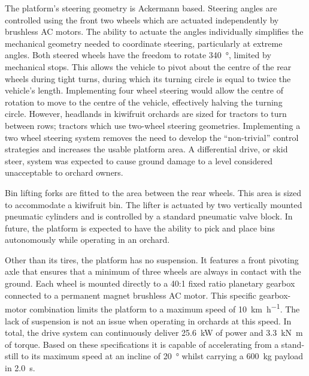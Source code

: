 \documentclass[preprint,authoryear,12pt]{elsarticle}
\begin{document}
        The platform's steering geometry is Ackermann based.
        Steering angles are controlled using the front two wheels which are actuated independently by brushless AC motors.
        The ability to actuate the angles individually simplifies the mechanical geometry needed to coordinate steering, particularly at extreme angles.
        Both steered wheels have the freedom to rotate \SI{340}{\degree}, limited by mechanical stops.
        This allows the vehicle to pivot about the centre of the rear wheels during tight turns, during which its turning circle is equal to twice the vehicle's length.
        Implementing four wheel steering would allow the centre of rotation to move to the centre of the vehicle, effectively halving the turning circle.
        However, headlands in kiwifruit orchards are sized for tractors to turn between rows; tractors which use two-wheel steering geometries.
        Implementing a two wheel steering system removes the need to develop the ``non-trivial'' control strategies and increases the usable platform area.
        A differential drive, or skid steer, system was expected to cause ground damage to a level considered unacceptable to orchard owners.

        Bin lifting forks are fitted to the area between the rear wheels.
        This area is sized to accommodate a kiwifruit bin.
        The lifter is actuated by two vertically mounted pneumatic cylinders and is controlled by a standard pneumatic valve block.
        In future, the platform is expected to have the ability to pick and place bins autonomously while operating in an orchard.

        Other than its tires, the platform has no suspension.
        It features a front pivoting axle that ensures that a minimum of three wheels are always in contact with the ground.
        Each wheel is mounted directly to a 40:1 fixed ratio planetary gearbox connected to a permanent magnet brushless AC motor.
        This specific gearbox-motor combination limits the platform to a maximum speed of \SI{10}{\kilo\meter\per\hour}.
        The lack of suspension is not an issue when operating in orchards at this speed.
        In total, the drive system can continuously deliver \SI{25.6}{\kilo\watt} of power and \SI{3.3}{\kilo\newton\meter} of torque.
        Based on these specifications it is capable of accelerating from a stand-still to its maximum speed at an incline of \SI{20}{\degree} whilst carrying a \SI{600}{\kilo\gram} payload in \SI{2.0}{\second}.
\end{document}
